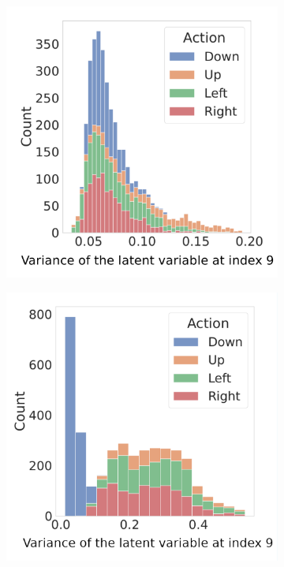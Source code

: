 \documentclass[twoside,11pt]{article}
\begin{document}
\begin{figure}[H]
    \centering
    \begin{subfigure}{.405\textwidth}
        \centering
        \includegraphics[draft=false,width=\linewidth]{cka_figures/chmm_127_Transition_variance}
        \caption{}\label{sfig:cka-trans-chmm-ba}
    \end{subfigure}%
    \begin{subfigure}{.4\textwidth}
        \centering
        \includegraphics[draft=false,width=\linewidth]{cka_figures/chmm_131_Transition_variance}
        \caption{}\label{sfig:cka-trans-chmm-ba}
    \end{subfigure}


\end{figure}
\end{document}
